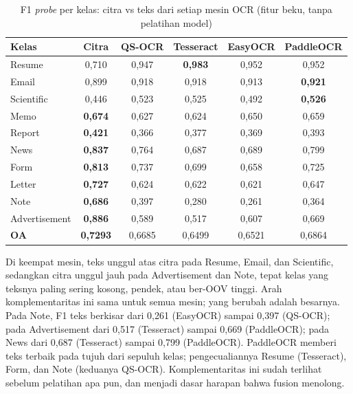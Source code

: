 \begin{table}[H]
  \centering
  \caption{F1 \textit{probe} per kelas: citra vs teks dari setiap mesin OCR (fitur beku,
  tanpa pelatihan model)}
  \label{tab:eda-komplementer}
  \fontsize{10}{12}\selectfont
  \begin{tabular}{|l|c|c|c|c|c|}
    \hline
    \textbf{Kelas} & \textbf{Citra} & \textbf{QS-OCR} & \textbf{Tesseract} &
    \textbf{EasyOCR} & \textbf{PaddleOCR} \\ \hline
    Resume & 0,710 & 0,947 & \textbf{0,983} & 0,952 & 0,952 \\ \hline
    Email & 0,899 & 0,918 & 0,918 & 0,913 & \textbf{0,921} \\ \hline
    Scientific & 0,446 & 0,523 & 0,525 & 0,492 & \textbf{0,526} \\ \hline
    Memo & \textbf{0,674} & 0,627 & 0,624 & 0,650 & 0,659 \\ \hline
    Report & \textbf{0,421} & 0,366 & 0,377 & 0,369 & 0,393 \\ \hline
    News & \textbf{0,837} & 0,764 & 0,687 & 0,689 & 0,799 \\ \hline
    Form & \textbf{0,813} & 0,737 & 0,699 & 0,658 & 0,725 \\ \hline
    Letter & \textbf{0,727} & 0,624 & 0,622 & 0,621 & 0,647 \\ \hline
    Note & \textbf{0,686} & 0,397 & 0,280 & 0,261 & 0,364 \\ \hline
    Advertisement & \textbf{0,886} & 0,589 & 0,517 & 0,607 & 0,669 \\ \hline
    \textbf{OA} & \textbf{0,7293} & 0,6685 & 0,6499 & 0,6521 & 0,6864 \\ \hline
  \end{tabular}
\end{table}

Di keempat mesin, teks unggul atas citra pada Resume, Email, dan Scientific, sedangkan citra
unggul jauh pada Advertisement dan Note, tepat kelas yang teksnya paling sering kosong,
pendek, atau ber-OOV tinggi. Arah komplementaritas ini sama untuk semua mesin; yang
berubah adalah besarnya. Pada Note, F1 teks berkisar dari 0,261 (EasyOCR) sampai 0,397
(QS-OCR); pada Advertisement dari 0,517 (Tesseract) sampai 0,669 (PaddleOCR); pada News
dari 0,687 (Tesseract) sampai 0,799 (PaddleOCR). PaddleOCR memberi teks terbaik pada
tujuh dari sepuluh kelas; pengecualiannya Resume (Tesseract), Form, dan Note (keduanya
QS-OCR). Komplementaritas ini sudah terlihat sebelum pelatihan
apa pun, dan menjadi dasar harapan bahwa fusion menolong.

